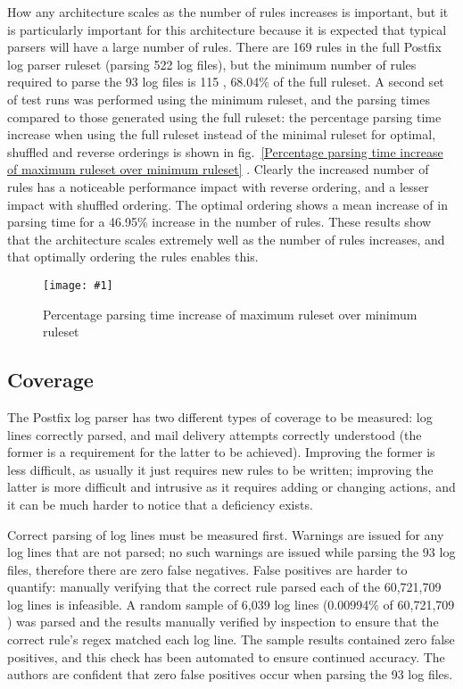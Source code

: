 \documentclass[preprint,draft,numbers,1p]{elsarticle}
\newcommand{\showgraph}[3]{%
    \begin{figure}[btp]%
        \texttt{[image: \#1]}%
        \caption{#2}\label{#3}%
    \end{figure}%
}
\newcommand{\refwithlabel}[2]{%
    #1~\vref{#2}%
}
\newcommand{\graphref}[1]{%
    \refwithlabel{fig.}{#1}%
}
\newcommand{\numberOFlogFILES}[0]{%
    93%
}
\newcommand{\numberOFrules}[0]{%
    169%
}
\newcommand{\numberOFrulesMINIMUM}[0]{%
    115%
}
\newcommand{\numberOFlogFILESall}[0]{%
    522%
}
\newcommand{\numberOFrulesMINIMUMpercentage}[0]{%
    68.04\%%
}
\newcommand{\numberOFrulesMAXIMUMpercentage}[0]{%
    46.95\%%
}
\newcommand{\numberOFlogLINES}[0]{%
    60,721,709%
}
\begin{document}
How any architecture scales as the number of rules increases is important,
but it is particularly important for this architecture because it is
expected that typical parsers will have a large number of rules.  There are
\numberOFrules{} rules in the full Postfix log parser ruleset (parsing
\numberOFlogFILESall{} log files), but the minimum number of rules required
to parse the \numberOFlogFILES{} log files is \numberOFrulesMINIMUM{},
\numberOFrulesMINIMUMpercentage{} of the full ruleset.  A second set of
test runs was performed using the minimum ruleset, and the parsing times
compared to those generated using the full ruleset: the percentage parsing
time increase when using the full ruleset instead of the minimal ruleset
for optimal, shuffled and reverse orderings is shown in
\graphref{Percentage parsing time increase of maximum ruleset over minimum
ruleset}.  Clearly the increased number of rules has a noticeable
performance impact with reverse ordering, and a lesser impact with shuffled
ordering.  The optimal ordering shows a mean increase of
 in parsing time for a
\numberOFrulesMAXIMUMpercentage{} increase in the number of rules.  These
results show that the architecture scales extremely well as the number of
rules increases, and that optimally ordering the rules enables this.
\showgraph{build/graph-full-ruleset-vs-minimum-ruleset}{Percentage parsing
time increase of maximum ruleset over minimum ruleset}{Percentage parsing
time increase of maximum ruleset over minimum ruleset}

\subsection{Coverage}

\label{coverage}

The Postfix log parser has two different types of coverage to be measured:
log lines correctly parsed, and mail delivery attempts correctly understood
(the former is a requirement for the latter to be achieved).  Improving the
former is less difficult, as usually it just requires new rules to be
written; improving the latter is more difficult and intrusive as it
requires adding or changing actions, and it can be much harder to notice
that a deficiency exists.

Correct parsing of log lines must be measured first.  Warnings are issued
for any log lines that are not parsed; no such warnings are issued while
parsing the \numberOFlogFILES{} log files, therefore there are zero false
negatives.  False positives are harder to quantify: manually verifying that
the correct rule parsed each of the \numberOFlogLINES{} log lines is
infeasible.  A random sample of 6,039 log lines (0.00994\% of
\numberOFlogLINES{}) was parsed and the results manually verified by
inspection to ensure that the correct rule's regex matched each log line.
The sample results contained zero false positives, and this check has been
automated to ensure continued accuracy.  The authors are confident that
zero false positives occur when parsing the \numberOFlogFILES{} log files.
\end{document}
